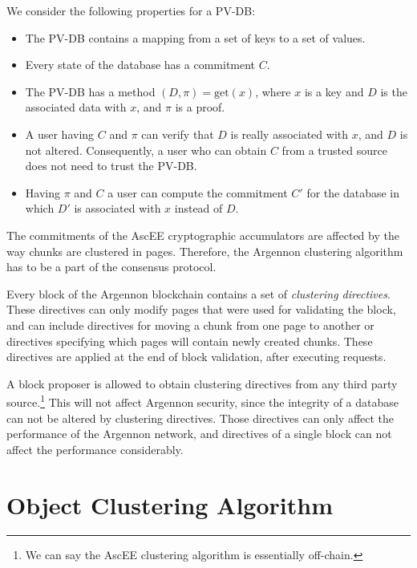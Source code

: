 We consider the following properties for a PV-DB:
\begin{itemize}
    \item The PV-DB contains a mapping from a set of keys to a set of values.
    \item Every state of the database has a commitment \(C\).
    \item The PV-DB has a method \((D, \pi) = \text{get}(x)\), where \(x\) is a key and \(D\) is the associated data
    with \(x\), and \(\pi\) is a proof.
    \item A user having \(C\) and \(\pi\) can verify that \(D\) is really associated with \(x\), and \(D\) is not
    altered. Consequently, a user who can obtain \(C\) from a trusted source does not need to trust the PV-DB\@.
    \item Having \(\pi\) and \(C\) a user can compute the commitment \(C'\) for the database in which \(D'\) is
    associated with \(x\) instead of \(D\).
\end{itemize}

The commitments of the AscEE cryptographic accumulators are affected by the way chunks are clustered in pages.
Therefore, the Argennon clustering algorithm has to be a part of the consensus protocol.

Every block of the Argennon blockchain contains a set of \emph{clustering directives}. These directives
can only modify pages that were used for validating the block, and can
include directives for moving a chunk from one page to another or directives specifying which pages will contain
newly created chunks. These directives are applied at the end of block validation, after executing requests.

A block proposer is allowed to obtain clustering directives from any third party source.\footnote{We can say the AscEE
clustering algorithm is essentially off-chain.} This will not
affect Argennon security, since the integrity of a database can not be altered by clustering directives.
Those directives can only affect the performance of the Argennon network, and directives of a single block can
not affect the performance considerably.

\section{Object Clustering Algorithm}\label{sec:clustering}



